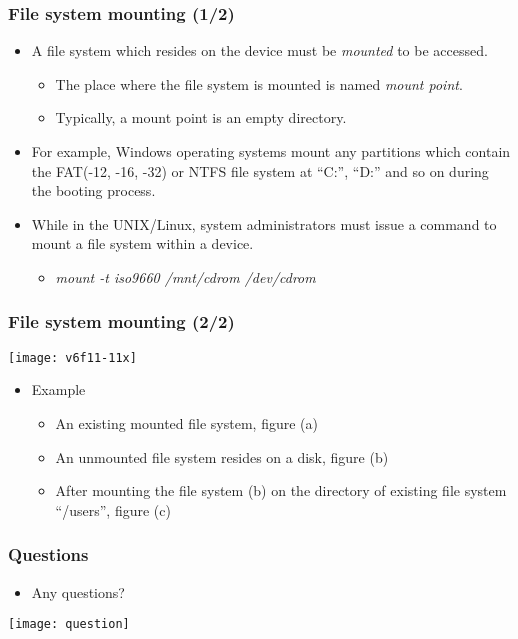 \documentclass[CJKutf8,xcolor=pdftex,dvipsnames,table]{beamer}
\begin{document}
\begin{CJK*}{UTF8}{song}
  \begin{frame}
    \frametitle{File system mounting (1/2)} \pause
    \begin{itemize}
    \item A file system which resides on the device must be \emph{mounted} to be accessed. \pause
      \begin{itemize}
      \item The place where the file system is mounted is named \emph{mount point}.\pause
      \item Typically, a mount point is an empty directory. \pause
      \end{itemize}
    \item For example, Windows operating systems mount any partitions which contain the FAT(-12, -16, -32) or NTFS file system at ``C:'', ``D:'' and so on during the booting process. \pause
    \item While in the UNIX/Linux, system administrators must issue a command to mount a file system within a device. \pause
      \begin{itemize}
      \item \emph{mount -t iso9660 /mnt/cdrom /dev/cdrom}
      \end{itemize}
    \end{itemize}
  \end{frame}

  \begin{frame}
    \frametitle{File system mounting (2/2)} \pause
    \begin{center}
      \texttt{[image: v6f11-11x]} \pause
    \end{center}
    \begin{itemize}\parskip=0pt
    \item Example \pause
      \begin{itemize}\parskip=0pt
      \item An existing mounted file system, figure (a) \pause
      \item An unmounted file system resides on a disk, figure (b) \pause
      \item After mounting the file system (b) on the directory of existing file system ``/users'', figure (c)
      \end{itemize}
    \end{itemize}
  \end{frame}

  \begin{frame}
    \frametitle{Questions}
    \begin{itemize}
    \item Any questions?
    \end{itemize}
    \begin{center}
      \texttt{[image: question]}
    \end{center}
  \end{frame}


\end{CJK*}
\end{document}
